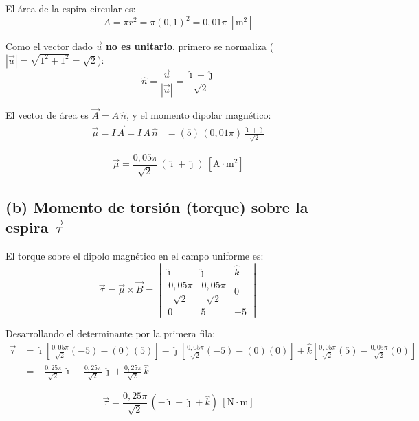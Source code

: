 \documentclass[12pt,letterpaper]{article}
\begin{document}
El \'area de la espira circular es:
\[
    A = \pi r^2 = \pi (0{,}1)^2 = 0{,}01\pi\ [\text{m}^2]
\]

Como el vector dado $\vec{u}$ \textbf{no es unitario}, primero se normaliza
($|\vec{u}| = \sqrt{1^2+1^2} = \sqrt{2}$):
\[
    \hat{n} = \frac{\vec{u}}{|\vec{u}|} = \frac{\hat{\imath}+\hat{\jmath}}{\sqrt{2}}
\]

El vector de \'area es $\vec{A} = A\,\hat{n}$, y el momento dipolar magn\'etico:
\begin{align*}
    \vec{\mu} = I\,\vec{A} = I\,A\,\hat{n}
             &= (5)\,(0{,}01\pi)\,\frac{\hat{\imath}+\hat{\jmath}}{\sqrt{2}}
\end{align*}

\[
    \boxed{\vec{\mu} = \frac{0{,}05\pi}{\sqrt{2}}\,(\hat{\imath}+\hat{\jmath})\ [\text{A}\cdot\text{m}^2]}
\]

\bigskip

\subsection*{(b) Momento de torsi\'on (torque) sobre la espira $\vec{\tau}$}

El torque sobre el dipolo magn\'etico en el campo uniforme es:
\[
    \vec{\tau} = \vec{\mu} \times \vec{B}
    = \begin{vmatrix}
        \hat{\imath} & \hat{\jmath} & \hat{k} \\[4pt]
        \dfrac{0{,}05\pi}{\sqrt{2}} & \dfrac{0{,}05\pi}{\sqrt{2}} & 0 \\[6pt]
        0 & 5 & -5
      \end{vmatrix}
\]

Desarrollando el determinante por la primera fila:
\begin{align*}
    \vec{\tau} &= \hat{\imath}\left[\frac{0{,}05\pi}{\sqrt{2}}(-5) - (0)(5)\right]
                - \hat{\jmath}\left[\frac{0{,}05\pi}{\sqrt{2}}(-5) - (0)(0)\right]
                + \hat{k}\left[\frac{0{,}05\pi}{\sqrt{2}}(5) - \frac{0{,}05\pi}{\sqrt{2}}(0)\right] \\[6pt]
               &= -\frac{0{,}25\pi}{\sqrt{2}}\,\hat{\imath}
                  + \frac{0{,}25\pi}{\sqrt{2}}\,\hat{\jmath}
                  + \frac{0{,}25\pi}{\sqrt{2}}\,\hat{k}
\end{align*}

\[
    \boxed{\vec{\tau} = \frac{0{,}25\pi}{\sqrt{2}}\,(-\hat{\imath}+\hat{\jmath}+\hat{k})\ [\text{N}\cdot\text{m}]}
\]
\end{document}
